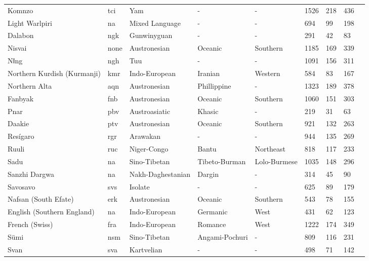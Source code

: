 \begin{longtable}{lllllllll}
Komnzo & tci & Yam & - & - & 1526 & 218 & 436 & \citet{doreco_komn1238} \\
Light Warlpiri & na & Mixed Language & - & - & 694 & 99 & 198 & \citet{doreco_ligh1234} \\
Dalabon & ngk & Gunwinyguan & - & - & 291 & 42 & 83 & \citet{doreco_ngal1292} \\
Nisvai & none & Austronesian & Oceanic & Southern & 1185 & 169 & 339 & \citet{doreco_nisv1234} \\
Nǁng & ngh & Tuu & - & - & 1091 & 156 & 311 & \citet{doreco_nngg1234} \\
Northern Kurdish (Kurmanji) & kmr & Indo-European & Iranian & Western & 584 & 83 & 167 & \citet{doreco_nort2641} \\
Northern Alta & aqn & Austronesian & Phillippine & - & 1323 & 189 & 378 & \citet{doreco_nort2875} \\
Fanbyak & fnb & Austronesian & Oceanic & Southern & 1060 & 151 & 303 & \citet{doreco_orko1234} \\
Pnar & pbv & Austroasiatic & Khasic & - & 219 & 31 & 63 & \citet{doreco_pnar1238} \\
Daakie & ptv & Austronesian & Oceanic & Southern & 921 & 132 & 263 & \citet{doreco_port1286} \\
Resígaro & rgr & Arawakan & - & - & 944 & 135 & 269 & \citet{doreco_resi1247} \\
Ruuli & ruc & Niger-Congo & Bantu & Northeast & 818 & 117 & 233 & \citet{doreco_ruul1235} \\
Sadu & na & Sino-Tibetan & Tibeto-Burman & Lolo-Burmese & 1035 & 148 & 296 & \citet{doreco_sadu1234} \\
Sanzhi Dargwa & na & Nakh-Daghestanian & Dargin & - & 314 & 45 & 90 & \citet{doreco_sanz1248} \\
Savosavo & svs & Isolate & - & - & 625 & 89 & 179 & \citet{doreco_savo1255} \\
Nafsan (South Efate) & erk & Austronesian & Oceanic & Southern & 543 & 78 & 155 & \citet{doreco_sout2856} \\
English (Southern England) & na & Indo-European & Germanic & West & 431 & 62 & 123 & \citet{doreco_sout3282} \\
French (Swiss) & fra & Indo-European & Romance & West & 1222 & 174 & 349 & \citet{doreco_stan1290} \\
Sümi & nsm & Sino-Tibetan & Angami-Pochuri & - & 809 & 116 & 231 & \citet{doreco_sumi1235} \\
Svan & sva & Kartvelian & - & - & 498 & 71 & 142 & \citet{doreco_svan1243} \\

\end{longtable}
